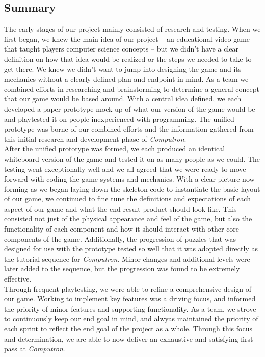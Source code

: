 \subsection{Summary}
The early stages of our project mainly consisted of research and testing. When we first began, we knew the main idea of our project -- an educational video game that taught players computer science concepts -- but we didn't have a clear definition on how that idea would be realized or the steps we needed to take to get there. We knew we didn't want to jump into designing the game and its mechanics without a clearly defined plan and endpoint in mind. As a team we combined efforts in researching and brainstorming to determine a general concept that our game would be based around. With a central idea defined, we each developed a paper prototype mock-up of what our version of the game would be and playtested it on people inexperienced with programming. The unified prototype was borne of our combined efforts and the information gathered from this initial research and development phase of \textit{Computron}.\\

After the unified prototype was formed, we each produced an identical whiteboard version of the game and tested it on as many people as we could. The testing went exceptionally well and we all agreed that we were ready to move forward with coding the game systems and mechanics. With a clear picture now forming as we began laying down the skeleton code to instantiate the basic layout of our game, we continued to fine tune the definitions and expectations of each aspect of our game and what the end result product should look like. This consisted not just of the physical appearance and feel of the game, but also the functionality of each component and how it should interact with other core components of the game. Additionally, the progression of puzzles that was designed for use with the prototype tested so well that it was adopted directly as the tutorial sequence for \textit{Computron}. Minor changes and additional levels were later added to the sequence, but the progression was found to be extremely effective.\\

Through frequent playtesting, we were able to refine a comprehensive design of our game. Working to implement key features was a driving focus, and informed the priority of minor features and supporting functionality. As a team, we strove to continuously keep our end goal in mind, and alwyas maintained the priority of each sprint to reflect the end goal of the project as a whole. Through this focus and determination, we are able to now deliver an exhaustive and satisfying first pass at \textit{Computron}.\\


